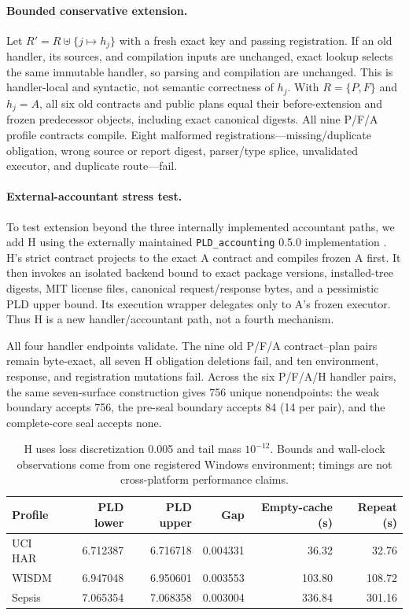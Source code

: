 \documentclass[letterpaper]{article}
\begin{document}
\paragraph{Bounded conservative extension.}
Let $R'=R\uplus\{j\mapsto h_j\}$ with a fresh exact key and passing
registration.  If an old handler, its sources, and compilation inputs are
unchanged, exact lookup selects the same immutable handler, so parsing and
compilation are unchanged.  This is handler-local and syntactic, not semantic
correctness of $h_j$.  With $R=\{P,F\}$ and $h_j=A$, all six old contracts and
public plans equal their before-extension and frozen predecessor objects,
including exact canonical digests.  All nine P/F/A profile contracts compile.
Eight malformed registrations---missing/duplicate obligation, wrong source or
report digest, parser/type splice, unvalidated executor, and duplicate
route---fail.

\paragraph{External-accountant stress test.}
To test extension beyond the three internally implemented accountant paths,
we add H using the externally maintained \texttt{PLD\_accounting} 0.5.0
implementation \citep{feldman2026efficientallocation}.  H's strict contract
projects to the exact A contract and compiles frozen A first.  It then invokes
an isolated backend bound to exact package versions, installed-tree digests,
MIT license files, canonical request/response bytes, and a pessimistic PLD
upper bound.  Its execution wrapper delegates only to A's frozen executor.
Thus H is a new handler/accountant path, not a fourth mechanism.

All four handler endpoints validate.  The nine old P/F/A contract--plan pairs remain
byte-exact, all seven H obligation deletions fail, and ten environment,
response, and registration mutations fail.  Across the six P/F/A/H handler
pairs, the same seven-surface construction gives 756 unique nonendpoints:
the weak boundary accepts 756, the pre-seal boundary accepts 84 (14 per pair),
and the complete-core seal accepts none.

\begin{table}[t]
\centering
\footnotesize
\setlength{\tabcolsep}{5pt}
\begin{tabular}{@{}lrrrrr@{}}
\toprule
Profile & PLD lower & PLD upper & Gap & Empty-cache (s) & Repeat (s) \\
\midrule
UCI HAR & 6.712387 & 6.716718 & 0.004331 & 36.32 & 32.76 \\
WISDM & 6.947048 & 6.950601 & 0.003553 & 103.80 & 108.72 \\
Sepsis & 7.065354 & 7.068358 & 0.003004 & 336.84 & 301.16 \\
\bottomrule
\end{tabular}
\caption{H uses loss discretization 0.005 and tail mass $10^{-12}$.  Bounds
and wall-clock observations come from one registered Windows environment;
timings are not cross-platform performance claims.}
\label{tab:supp-external-h}
\end{table}
\end{document}
